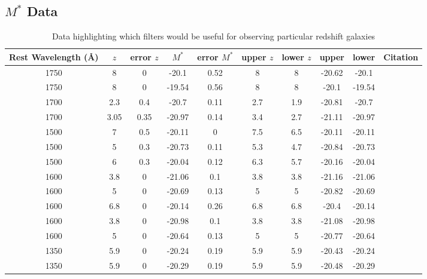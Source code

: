 	\subsection{$M^{*}$ Data} %
	\label{sub:m_data}
		\begin{table}[ht]
			\begin{center}
				\begin{tabular}{c|c|c|c|c|c|c|c|c|c}
					Rest Wavelength (\AA)	&$z$	&error $z$	&$M^*$	&error $M^*$	&upper $z$	&lower $z$	&upper 	&lower& Citation\\
					\hline \hline
					1750	&8	&0	&-20.1	&0.52	&8	&8	&-20.62	&-20.1	& \cite{2009ApJ...692..778R}\\
					1750	&8	&0	&-19.54	&0.56	&8	&8	&-20.1	&-19.54	& \cite{2009ApJ...692..778R}\\
					1700	&2.3	&0.4	&-20.7	&0.11	&2.7	&1.9	&-20.81	&-20.7	& \cite{2009ApJ...692..778R}\\
					1700	&3.05	&0.35	&-20.97	&0.14	&3.4	&2.7	&-21.11	&-20.97	& \cite{2009ApJ...692..778R}\\
					1500	&7	&0.5	&-20.11	&0	&7.5	&6.5	&-20.11	&-20.11	& \cite{2010MNRAS.403..960M}\\
					1500	&5	&0.3	&-20.73	&0.11	&5.3	&4.7	&-20.84	&-20.73	& \cite{2010MNRAS.403..960M}\\
					1500	&6	&0.3	&-20.04	&0.12	&6.3	&5.7	&-20.16	&-20.04	& \cite{2010MNRAS.403..960M}\\
					1600	&3.8	&0	&-21.06	&0.1	&3.8	&3.8	&-21.16	&-21.06	& \cite{2007ApJ...670..928B}\\
					1600	&5	&0	&-20.69	&0.13	&5	&5	&-20.82	&-20.69	& \cite{2007ApJ...670..928B}\\
					1600	&6.8	&0	&-20.14	&0.26	&6.8	&6.8	&-20.4	&-20.14	& \cite{2011ApJ...737...90B}\\
					1600	&3.8	&0	&-20.98	&0.1	&3.8	&3.8	&-21.08	&-20.98	& \cite{2011ApJ...737...90B}\\
					1600	&5	&0	&-20.64	&0.13	&5	&5	&-20.77	&-20.64	& \cite{2011ApJ...737...90B}\\
					1350	&5.9	&0	&-20.24	&0.19	&5.9	&5.9	&-20.43	&-20.24	& \cite{2011ApJ...737...90B}\\
					1350	&5.9	&0	&-20.29	&0.19	&5.9	&5.9	&-20.48	&-20.29	& \cite{2007ApJ...670..928B}
				\end{tabular}
			\end{center}
			\caption{Data highlighting which filters would be useful for observing particular redshift galaxies\cite{Galactic_Astronomy_Binney_Merrifield}}
			\label{tab:filter_characteristics}
		\end{table}
